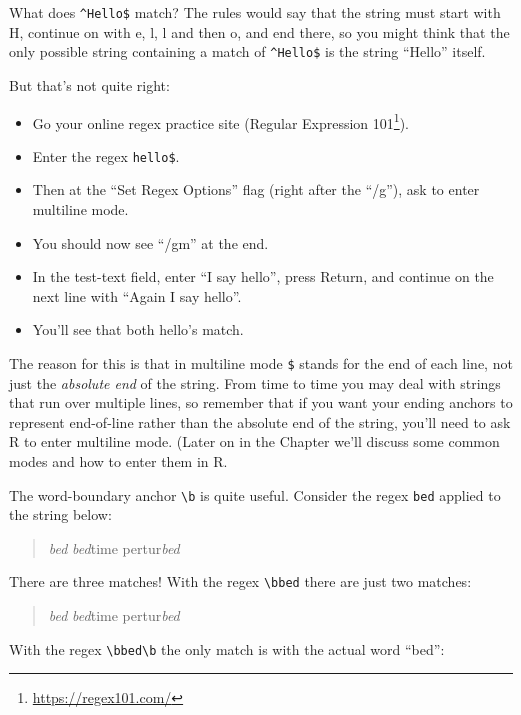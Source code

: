 \documentclass[]{book}
\providecommand{\tightlist}{%
  \setlength{\itemsep}{0pt}\setlength{\parskip}{0pt}}
\let\rmarkdownfootnote\footnote%
\def\footnote{\protect\rmarkdownfootnote}
\renewcommand{\href}[2]{#2\footnote{\url{#1}}}
\renewcommand{\href}[2]{#2\footnote{\url{#1}}}
\theoremstyle{definition}
\theoremstyle{definition}
\theoremstyle{remark}
\begin{document}
{What does \texttt{\^{}Hello\$} match? The rules would say that the
string must start with H, continue on with e, l, l and then o, and end
there, so you might think that the only possible string containing a
match of \texttt{\^{}Hello\$} is the string ``Hello'' itself.

But that's not quite right:

\begin{itemize}
\tightlist
\item
  Go your online regex practice site
  (\href{https://regex101.com/}{Regular Expression 101}).
\item
  Enter the regex \texttt{hello\$}.
\item
  Then at the ``Set Regex Options'' flag (right after the ``/g''), ask
  to enter multiline mode.
\item
  You should now see ``/gm'' at the end.
\item
  In the test-text field, enter ``I say hello'', press Return, and
  continue on the next line with ``Again I say hello''.
\item
  You'll see that both hello's match.
\end{itemize}

The reason for this is that in multiline mode \texttt{\$} stands for the
end of each line, not just the \emph{absolute end} 
of the string. From time to time you may deal with strings that run over
multiple lines, so remember that if you want your ending anchors to
represent end-of-line rather than the absolute end of the string, you'll
need to ask R to enter multiline mode. (Later on in the Chapter we'll
discuss some common modes and how to enter them in R.

The word-boundary anchor \texttt{\textbackslash{}b} is quite useful.
Consider the regex \texttt{bed} applied to the string below:

\begin{quote}
\emph{bed} \emph{bed}time pertur\emph{bed}
\end{quote}

There are three matches! With the regex \texttt{\textbackslash{}bbed}
there are just two matches:

\begin{quote}
\emph{bed} \emph{bed}time pertur\emph{bed}
\end{quote}

With the regex \texttt{\textbackslash{}bbed\textbackslash{}b} the only
match is with the actual word ``bed'':

}
\end{document}
